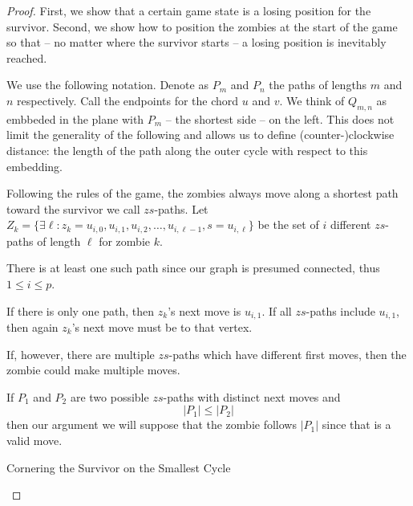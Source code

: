 \begin{proof}
 First, we show that a certain game state is a losing position for the survivor.
 Second, we show how to position the zombies at the start of the game so that --
 no matter where the survivor starts -- a losing position is inevitably reached.

 We use the following notation.
 Denote as $P_m$ and $P_n$ the paths of lengths $m$ and $n$ respectively.
 Call the endpoints for the chord $u$ and $v$.
 We think of $Q_{m,n}$ as embbeded in the plane with $P_m$
 -- the shortest side -- on the left.
 This does not limit the generality of the following and allows us to define (counter-)clockwise distance: the length of the path
 along the outer cycle with respect to this embedding.

 Following the rules of the game, the zombies always move along a shortest path toward the survivor we call $zs$-paths. Let
 $Z_k = \{  \exists \ell : z_k = u_{i,0}, u_{i, 1}, u_{i, 2}, \dots, u_{i, \ell-1}, s= u_{i, \ell}\}$ be the set of $i$ different $zs$-paths of length $\ell$ for zombie $k$.

 There is at least one such path since our graph is presumed connected,
 thus $1 \leq i \leq p$.

 If there is only one path, then $z_k$'s next move is $u_{i, 1}$. If all $zs$-paths
 include $u_{i,1}$, then again $z_k$'s next move must be to that vertex.

 If, however, there are multiple $zs$-paths which have different first moves,
 then the zombie could make multiple moves.

 If $P_1$ and $P_2$ are two possible $zs$-paths with distinct next moves and
 \[ |P_1| \leq |P_2| \]
 then our argument we will suppose that the zombie follows $|P_1|$ since that is a valid move.

 \newpage

 \begin{proofpart} Cornering the Survivor on the Smallest Cycle


\end{proofpart}
\end{proof}
